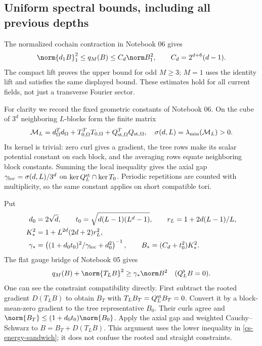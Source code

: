 \subsection{Uniform spectral bounds, including all previous depths}

The normalized cochain contraction in Notebook 06 gives
\begin{equation}\label{cs-energy-sandwich}
 \norm{d_1B}_1^2\le q_M(B)\le C_d\norm B_1^2,
 \qquad C_d=2^{d+6}(d-1).
\end{equation}
The compact lift proves the upper bound for odd $M\ge3$; $M=1$
uses the identity lift and satisfies the same displayed bound.
These estimates hold for all current fields, not just a transverse
Fourier sector.

For clarity we record the fixed geometric constants of Notebook 06.
On the cube of $3^d$ neighboring $L$-blocks form the finite matrix
\[
 \mathcal M_L=d_\Omega^Td_\Omega+
 T_{0,\Omega}^TT_{0,\Omega}+
 Q_{{\rm st},\Omega}^TQ_{{\rm st},\Omega},
 \quad \sigma(d,L)=\lambda_{\min}(\mathcal M_L)>0.
\]
Its kernel is trivial: zero curl gives a gradient, the tree rows
make its scalar potential constant on each block, and the averaging
rows equate neighboring block constants. Summing the local
inequality gives the axial gap
$\gamma_{\rm loc}=\sigma(d,L)/3^d$ on
$\ker Q_L^{\rm st}\cap\ker T_0$. Periodic repetitions are counted
with multiplicity, so the same constant applies on short compatible
tori.

Put
\begin{equation}\label{cs-constants}
 \begin{split}
 d_0&=2\sqrt d,\qquad
 t_0=\sqrt{d(L-1)(L^d-1)},\qquad
 r_L=1+2d(L-1)/L,\\
 K_*^2&=1+L^{2d}(2d+2)r_L^2,\\
 \gamma_*&=
 \left((1+d_0t_0)^2/\gamma_{\rm loc}+d_0^2\right)^{-1},
 \qquad B_*=(C_d+t_0^2)K_*^2.
 \end{split}
\end{equation}
The flat gauge bridge of Notebook 05 gives
\[
 q_M(B)+\norm{T_LB}^2\ge\gamma_*\norm B^2
 \quad (Q_L^\flat B=0).
\]
One can see the constraint compatibility directly. First subtract
the rooted gradient $D(T_LB)$ to obtain $B_T$ with
$T_LB_T=Q_L^{\rm st}B_T=0$. Convert it by a block-mean-zero
gradient to the tree representative $B_0$. Their curls agree and
$\norm{B_T}\le(1+d_0t_0)\norm{B_0}$. Apply the axial gap and
weighted Cauchy--Schwarz to
$B=B_T+D(T_LB)$. This argument uses the lower inequality in
\eqref{cs-energy-sandwich}; it does not confuse the rooted and
straight constraints.

